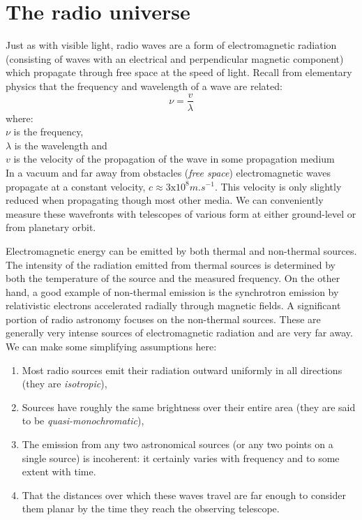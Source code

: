 \section{The radio universe}
Just as with visible light, radio waves are a form of electromagnetic radiation (consisting of waves with an electrical and perpendicular magnetic component) which propagate through free space at the speed 
of light. Recall from elementary physics that the frequency and wavelength of a wave are related:
\begin{equation*}
 \nu = \frac{v}{\lambda}
\end{equation*}
where:\\
$\nu$ is the frequency,\\
$\lambda$ is the wavelength and\\
$v$ is the velocity of the propagation of the wave in some propagation medium\\

In a vacuum and far away from obstacles (\textit{free space}) electromagnetic waves propagate at a constant velocity, $c\approx 3\text{x}10^8m.s^{-1}$. This velocity is only slightly reduced
when propagating though most other media. We can conveniently measure these wavefronts with telescopes of various form at either ground-level or from planetary orbit. 

Electromagnetic energy can be emitted by both thermal and non-thermal sources. The intensity of the radiation emitted from thermal sources is determined by both the temperature of the source and the measured frequency. On the other hand, a good example of non-thermal emission is the 
synchrotron emission by relativistic electrons accelerated radially through magnetic fields. A significant portion of radio astronomy focuses on the non-thermal sources. These are generally very intense sources of 
electromagnetic radiation and are very far away. We can make some simplifying assumptions here:
\begin{enumerate}
 \item Most radio sources emit their radiation outward uniformly in all directions (they are \textit{isotropic}),
 \item Sources have roughly the same brightness over their entire area (they are said to be \textit{quasi-monochromatic}), 
 \item The emission from any two astronomical sources (or any two points on a single source) is incoherent: it certainly
 varies with frequency and to some extent with time.
 \item That the distances over which these waves travel are far enough to consider them planar by the time they reach the observing telescope.
\end{enumerate}

